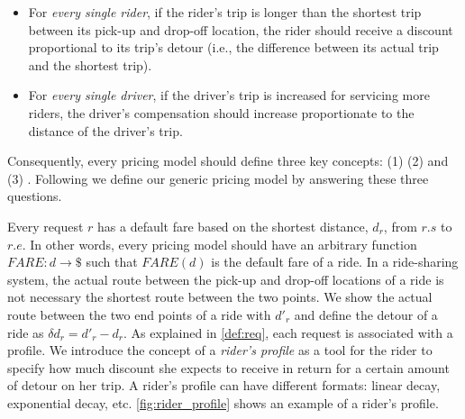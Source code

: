 \begin{itemize}
\item For \textit{every single rider}, if the rider's trip is longer than the shortest trip between its pick-up and drop-off location, the rider should receive a discount proportional to its trip's detour (i.e., the difference between its actual trip and the shortest trip).
\item For \textit{every single driver}, if the driver's trip is increased for servicing more riders, the driver's compensation should increase proportionate to the distance of the driver's trip.
\end{itemize}

Consequently, every pricing model should define three key concepts: (1)  (2)  and (3) . Following we define our generic pricing model by answering these three questions.

Every request $r$ has a default fare based on the shortest distance, $d_r$, from $r.s$ to $r.e$. In other words, every pricing model should have an arbitrary function $FARE: d \rightarrow \$ $ such that $FARE(d)$ is the default fare of a ride. In a ride-sharing system, the actual route between the pick-up and drop-off locations of a ride is not necessary the shortest route between the two points. We show the actual route between the two end points of a ride with $d'_r$ and define the detour of a ride as $\delta d_r = d'_r - d_r$. As explained in \cref{def:req}, each request is associated with a profile. We introduce the concept of a \textit{rider's profile} as a tool for the rider to specify how much discount she expects to receive in return for a certain amount of detour on her trip. A rider's profile can have different formats: linear decay, exponential decay, etc. \cref{fig:rider_profile} shows an example of a rider's profile.

